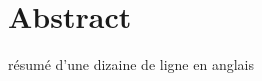 \documentclass[a4paper,11pt,final]{report}
\begin{document}
\sloppy %

 



\tableofcontents %







 




\chapter{Abstract}
résumé d'une dizaine de ligne en anglais


\appendix
\end{document}
